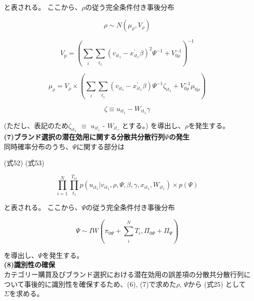 \documentclass[11pt]{jsarticle}
\begin{document}
と表される。
ここから、$\rho$の従う完全条件付き事後分布

\begin{equation} \label{formula50}
\rho \sim N(\mu_{\rho}, V_{\rho})
\end{equation}

\begin{equation} \label{formula51}
V_{p} = 
\left(
\sum_{\substack{i}} \sum_{\substack{t_{1}}} (v_{it_{1}} - x^{\prime}_{it_{1}} \beta)^2 \Psi^{-1} + V^{-1}_{0\rho}
\right)^{-1}
\end{equation}

\begin{equation} \label{formula52}
\mu_{\rho} = V_{\rho} \times 
\left(
\sum_{\substack{i}} \sum_{\substack{t_{1}}} (v_{it_{1}} - x^{\prime}_{it_{1}} \beta) \Psi^{-1} \zeta_{it_{1}} + V^{-1}_{0\rho} \mu_{0\rho}
\right)
\end{equation}

\begin{equation} \label{formula52-1}
\zeta \equiv u_{it_{1}} - W_{it_{1}} \gamma
\end{equation}

(ただし、表記のため$\zeta_{it_{1}}$ $\equiv$ $u_{it_{1}}$ - $W_{it_{\gamma}}$ とする。)
を導出し、$\rho$を発生する。\\[1ex] 

{\bf (7)ブランド選択の潜在効用に関する分散共分散行列$\Psi$の発生}\\
同時確率分布のうち、$\Psi$に関する部分は

(式52)
(式53)

\begin{equation} \label{formula53}
\prod_{i=1}^{N} \prod_{t_{1}}^{T_{i1}} p(u_{it_{1}} | v_{it_{1}}, \rho, \Psi, \beta, \gamma, x_{it_{1}}, W_{it_{1}}) \times p(\Psi)
\end{equation}

と表される。
ここから、$\Psi$の従う完全条件付き事後分布

\begin{equation} \label{formula54}
\Psi \sim IW
\left(
\pi_{0\Psi} + \sum_{\substack{i}}^{\substack{N}} T_{i}, \Pi_{0\Psi} + \Pi_{\Psi}
\right)
\end{equation}

を導出し、$\Psi$を発生する。\\[1ex] 

{\bf (8)識別性の確保}\\
カテゴリー購買及びブランド選択における潜在効用の誤差項の分散共分散行列について事後的に識別性を確保するため、(6), (7)で求めた$\rho$, $\Psi$から
(式25)
として$\Sigma$を求める。
\end{document}
